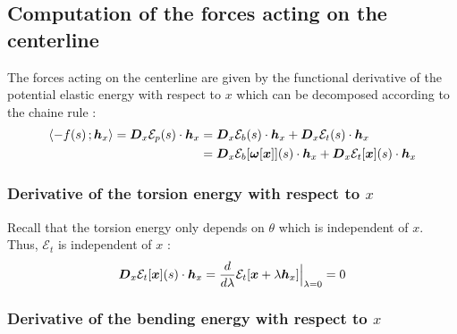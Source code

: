 \subsection{Computation of the forces acting on the centerline}

The forces acting on the centerline are given by the functional derivative of the potential elastic energy with respect to $x$ which can be decomposed according to the chaine rule :
\begin{equation}
	\begin{aligned}
	\langle -f(s)\,; \boldsymbol{h}_x\rangle = \boldsymbol{D}_x\mathcal{E}_p(s)\cdot\boldsymbol{h}_x
	&= \boldsymbol{D}_x\mathcal{E}_b(s)\cdot\boldsymbol{h}_x + \boldsymbol{D}_x\mathcal{E}_t(s)\cdot\boldsymbol{h}_x \\
	&= \boldsymbol{D}_x\mathcal{E}_b[\boldsymbol{\omega}[\boldsymbol{x}]](s)\cdot\boldsymbol{h}_x + \boldsymbol{D}_x\mathcal{E}_t[\boldsymbol{x}](s)\cdot\boldsymbol{h}_x \\
	\end{aligned}
\end{equation}

\subsubsection{Derivative of the torsion energy with respect to $x$}

Recall that the torsion energy only depends on $\theta$ which is independent of $x$. Thus, $\mathcal{E}_t$ is independent of $x$ :
\begin{equation}
	\boldsymbol{D}_x\mathcal{E}_t[\boldsymbol{x}](s)\cdot\boldsymbol{h}_x
		= \frac{d}{d\lambda} \mathcal{E}_t[\boldsymbol{x} + \lambda \boldsymbol{h}_x]\Bigr|_{\lambda = 0} = 0
\end{equation}

\subsubsection{Derivative of the bending energy with respect to $x$}

